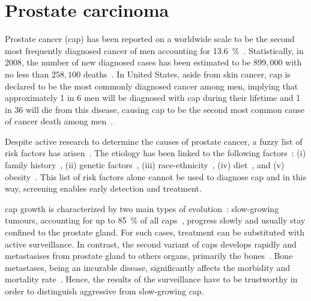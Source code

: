 
\section{Prostate carcinoma}
Prostate cancer (\acs{cap}) has been reported on a worldwide scale to be the second most frequently diagnosed cancer of men accounting for \SI{13.6}{\percent}~\cite{Ferlay2010}.
Statistically, in 2008, the number of new diagnosed cases has been estimated to be $899,000$ with no less than $258,100$ deaths~\cite{Ferlay2010}.
In United States, aside from skin cancer, \ac{cap} is declared to be the most commonly diagnosed cancer among men, implying that approximately 1 in 6 men will be diagnosed with \ac{cap} during their lifetime and 1 in 36 will die from this disease, causing \ac{cap} to be the second most common cause of cancer death among men~\cite{Siegel2013,Society2013}.

Despite active research to determine the causes of prostate cancer, a fuzzy list of risk factors has arisen~\cite{Society2010}.
The etiology has been linked to the following factors~\cite{Society2010}: (i) family history~\cite{Giovannucci2007,Steinberg1990}, (ii) genetic factors~\cite{Freedman2006,Amundadottir2006,Agalliu2009}, (iii) race-ethnicity~\cite{Giovannucci2007,Hoffman2001}, (iv) diet~\cite{Giovannucci2007,Ma2009,Alexander2010}, and (v) obesity~\cite{Giovannucci2007,Rodriguez2007}.
This list of risk factors alone cannot be used to diagnose \ac{cap} and in this way, screening enables early detection and treatment.

\ac{cap} growth is characterized by two main types of evolution~\cite{Strum2005}: slow-growing tumours, accounting for up to \SI{85}{\percent} of all \acp{cap}~\cite{Lu-Yao2009}, progress slowly and usually stay confined to the prostate gland.
For such cases, treatment can be substituted with active surveillance.
In contrast, the second variant of \acp{cap} develops rapidly and metastasises from prostate gland to others organs, primarily the bones~\cite{Oster2013}.
Bone metastases, being an incurable disease, significantly affects the morbidity and mortality rate~\cite{Ye2007}.
Hence, the results of the surveillance have to be trustworthy in order to distinguish aggressive from slow-growing \ac{cap}.

